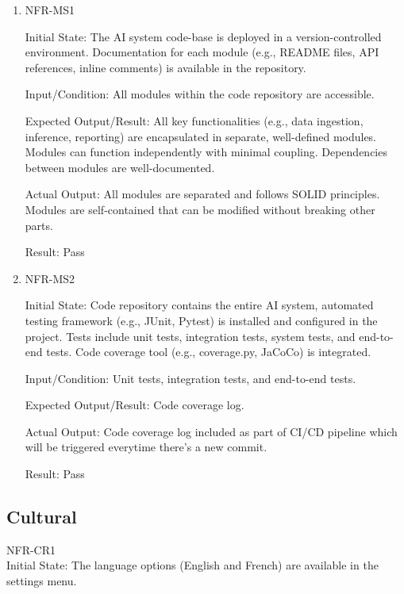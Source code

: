 \documentclass[12pt, titlepage]{article}
\begin{document}
\begin{enumerate}

  \item{NFR-MS1\\}\label{NFR-MS1}

  Initial State: The AI system code-base is deployed in a version-controlled environment. Documentation for each module (e.g., README files, API references, inline comments) is available in the repository.

  Input/Condition: All modules within the code repository are accessible.

  Expected Output/Result: All key functionalities (e.g., data ingestion, inference, reporting) are encapsulated in separate, well-defined modules. Modules can function independently with minimal coupling. Dependencies between modules are well-documented.

  Actual Output: All modules are separated and follows SOLID principles. Modules are self-contained that can be modified without breaking other parts.

  Result: Pass

  \item{NFR-MS2\\}\label{NFR-MS2}

  Initial State: Code repository contains the entire AI system, automated testing framework (e.g., JUnit, Pytest) is installed and configured in the project. Tests include unit tests, integration tests, system tests, and end-to-end tests. Code coverage tool (e.g., coverage.py, JaCoCo) is integrated.

  Input/Condition: Unit tests, integration tests, and end-to-end tests.

  Expected Output/Result: Code coverage log.

  Actual Output: Code coverage log included as part of CI/CD pipeline which will be triggered everytime there's a new commit.

  Result: Pass

\end{enumerate}

\subsection{Cultural}
\item{NFR-CR1\\}\label{NFR-CR1}
Initial State: The language options (English and French) are available in the settings menu.
\end{document}
